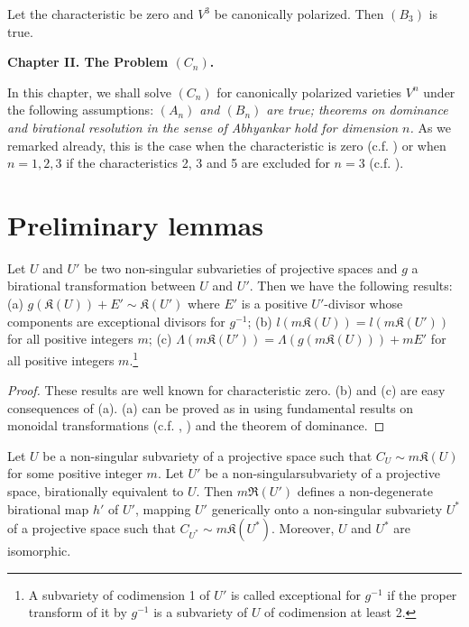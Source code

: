 \begin{coro*}
Let the characteristic be zero and $V^{3}$ be canonically polarized. Then $(B_{3})$ is true.
\end{coro*}

\bigskip

\begin{center}
{\Large\bf Chapter II. The Problem $(C_{n})$.}
\end{center}

In this chapter, we shall solve $(C_{n})$ for canonically polarized varieties $V^{n}$ under the following assumptions: {\em $(A_{n})$ and $(B_{n})$ are true; theorems on dominance and birational resolution in the sense of Abhyankar hold for dimension $n$.} As we remarked already, this is the case when the characteristic is zero (c.f. \cite{art14-key5}) or when $n=1,2,3$ if the characteristics 2, 3 and 5 are excluded for $n=3$ (c.f. \cite{art14-key35}).

\section{Preliminary lemmas}\label{art14-sec8}

\begin{lemma}\label{art14-lem12}
Let $U$ and $U'$ be two non-singular subvarieties of projective spaces and $g$ a birational transformation between $U$ and $U'$. Then we have the following results: {\rm(a)} $g(\mathfrak{K}(U))+E'\sim \mathfrak{K}(U')$ where $E'$ is a positive $U'$-divisor whose components are exceptional divisors for $g^{-1}$; {\rm(b)} $l(m\mathfrak{K}(U))=l(m\mathfrak{K}(U'))$ for all positive integers $m$; {\rm(c)} $\Lambda(m\mathfrak{K}(U'))=\Lambda(g(m\mathfrak{K}(U)))+mE'$ for all positive integers $m$.\footnote{A subvariety of codimension 1 of $U'$ is called exceptional for $g^{-1}$ if the proper transform of it by $g^{-1}$ is a subvariety of $U$ of codimension at least 2.} 
\end{lemma}

\begin{proof}
These results are well known for characteristic zero. (b) and (c) are easy consequences of (a). (a) can be proved as in \cite{art14-key33} using fundamental results on monoidal transformations (c.f. \cite{art14-key29}, \cite{art14-key33}) and the theorem of dominance.
\end{proof}

\begin{lemma}\label{art14-lem13}
Let $U$ be a non-singular subvariety of a projective space such that $C_{U}\sim m\mathfrak{K}(U)$ for some positive integer $m$. Let $U'$ be a non-singular\pageoriginale subvariety of a projective space, birationally equivalent to $U$. Then $m\mathfrak{R}(U')$ defines a non-degenerate birational map $h'$ of $U'$, mapping $U'$ generically onto a non-singular subvariety $U^{*}$ of a projective space such that $C_{U^{*}}\sim m\mathfrak{K}(U^{*})$. Moreover, $U$ and $U^{*}$ are isomorphic.
\end{lemma}

